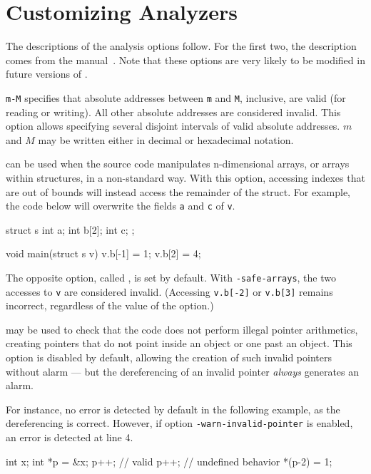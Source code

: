 \section{Customizing Analyzers}\label{sec:customizing-analyzers}

The descriptions of the analysis options follow. For the first two, the
description comes from the \Value manual~\cite{value}. Note that
these options are very likely to be modified in future versions of \FramaC.

\begin{description}
\item {} \texttt{m-M}
specifies that absolute addresses between \lstinline$m$ and 
\lstinline$M$, inclusive, are valid (for reading or writing).
All other absolute addresses are considered invalid.
This option allows specifying several disjoint intervals of valid absolute
addresses.
$m$ and $M$ may be written either in decimal or hexadecimal notation.

\item {} can be used when the source
code manipulates n-dimensional arrays, or arrays within structures,
in a non-standard way. With this option, accessing
indexes that are out of bounds will instead access
the remainder of the struct. For example, the code below will overwrite
the fields \lstinline|a| and \lstinline|c| of \lstinline|v|.
\begin{ccode}
struct s {
  int a;
  int b[2];
  int c;
};

void main(struct s v) {
  v.b[-1] = 1;
  v.b[2] = 4;
}
\end{ccode}
The opposite option, called , is set by default.
With \texttt{-safe-arrays}, the two accesses to \lstinline|v| are considered
invalid. (Accessing \lstinline|v.b[-2]| or \lstinline|v.b[3]| remains incorrect,
regardless of the value of the option.)

\item {} may be used to check that the code
  does not perform illegal pointer arithmetics, creating pointers that do not
  point inside an object or one past an object.
  This option is disabled by default, allowing the creation of such invalid
  pointers without alarm — but the dereferencing of an invalid pointer
  \emph{always} generates an alarm.

  For instance, no error is detected by default in the following example, as
  the dereferencing is correct. However, if option
  \texttt{-warn-invalid-pointer} is enabled, an error is detected at line 4.
\begin{ccode}
int x;
int *p = &x;
p++;  // valid
p++;  // undefined behavior
*(p-2) = 1;
\end{ccode}


\end{description}
